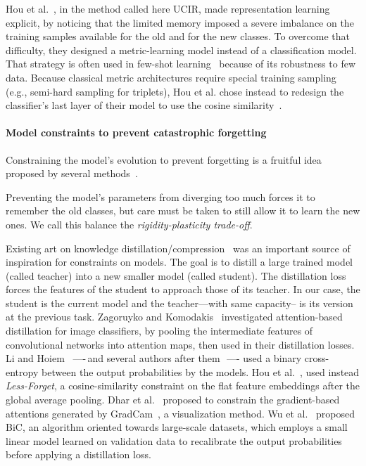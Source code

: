 Hou et al.~\citep{hou2019ucir}, in the method called here UCIR, made representation learning
explicit, by noticing that the limited memory imposed a severe imbalance on the training samples
available for the old and for the new classes. To overcome that difficulty, they designed a
metric-learning model instead of a classification model. That strategy is often used in few-shot
learning~\citep{gidaris2018fewshot_wo_forgetting} because of its robustness to few data. Because
classical metric architectures require special training sampling (e.g., semi-hard sampling for
triplets), Hou et al. chose instead to redesign the classifier's last layer of their model to use
the cosine similarity~\citep{luo2018cosine_classifier}.

\paragraph{Model constraints to prevent catastrophic forgetting} Constraining the model's evolution
to prevent forgetting is a fruitful idea proposed by several
methods~\citep{kirkpatrick2017ewc,lopezpaz2017gem,aljundi2018MemoryAwareSynapses,li2018lwf,rebuffi2017icarl,castro2018end_to_end_inc_learn}.

Preventing the model's parameters from diverging too much forces it to remember the old classes, but
care must be taken to still allow it to learn the new ones. We call this balance the
\textit{rigidity-plasticity trade-off}.

Existing art on knowledge distillation/compression~\citep{hinton2015knowledge_distillation} was an
important source of inspiration for constraints on models. The goal is to distill a large trained
model (called teacher) into a new smaller model (called student). The distillation loss forces the
features of the student to approach those of its teacher. In our case, the student is the current
model and the teacher---with same capacity-- is its version at the previous task. Zagoruyko and
Komodakis~\citep{komodakis2017attention_residual_distillation} investigated attention-based
distillation for image classifiers, by pooling the intermediate features of convolutional networks
into attention maps, then used in their distillation losses. Li and Hoiem~\citep{li2018lwf} —-\,and
several authors after
them~\citep{rebuffi2017icarl,castro2018end_to_end_inc_learn,wu2019bias_correction}\,—- used a binary
cross-entropy between the output probabilities by the models. Hou et al.~\citep{hou2019ucir}, used
instead \textit{Less-Forget}, a cosine-similarity constraint on the flat feature embeddings after
the global average pooling. Dhar et al.~\citep{dhar2019learning_without_memorizing_gradcam} proposed
to constrain the gradient-based attentions generated by GradCam~\citep{selvaraju2017gradcam}, a
visualization method. Wu et al.~\citep{wu2019bias_correction} proposed BiC, an algorithm oriented
towards large-scale datasets, which employs a small linear model learned on validation data to
recalibrate the output probabilities before applying a distillation loss.

